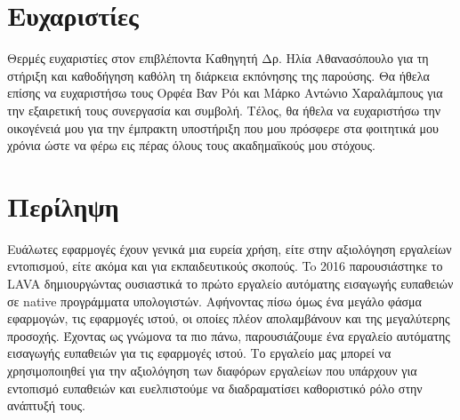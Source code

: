 \documentclass[12pt]{report}
\begin{document}
\newpage
{}
\setcounter{page}{1}

\section*{Ευχαριστίες}
Θερμές ευχαριστίες στον επιβλέποντα Καθηγητή Δρ. Hλία Αθανασόπουλο για τη στήριξη και καθοδήγηση καθόλη τη διάρκεια εκπόνησης της παρούσης.
Θα ήθελα επίσης να ευχαριστήσω τους Ορφέα Βαν Ρόι και Μάρκο Αντώνιο Χαραλάμπους για την εξαιρετική τους συνεργασία και συμβολή.
Τέλος, θα ήθελα να ευχαριστήσω την οικογένειά μου για την έμπρακτη υποστήριξη που μου
πρόσφερε στα φοιτητικά μου χρόνια ώστε να φέρω εις πέρας όλους τους ακαδημαϊκούς μου
στόχους.
\vspace*{2cm}

\newpage
\section*{Περίληψη}

Ευάλωτες εφαρμογές έχουν γενικά μια ευρεία χρήση, είτε στην αξιολόγηση εργαλείων εντοπισμού, είτε ακόμα και για εκπαιδευτικούς σκοπούς.
To 2016 παρουσιάστηκε το \textlatin{LAVA} δημιουργώντας ουσιαστικά το πρώτο εργαλείο 
αυτόματης εισαγωγής ευπαθειών σε \textlatin{native} προγράμματα υπολογιστών.
Αφήνοντας πίσω όμως ένα μεγάλο φάσμα εφαρμογών, τις εφαρμογές ιστού, οι οποίες πλέον απολαμβάνουν και της μεγαλύτερης προσοχής. Έχοντας ως γνώμονα 
τα πιο πάνω, παρουσιάζουμε ένα εργαλείο αυτόματης εισαγωγής ευπαθειών για τις εφαρμογές ιστού. Το εργαλείο μας μπορεί να χρησιμοποιηθεί για την
αξιολόγηση των διαφόρων εργαλείων που υπάρχουν για εντοπισμό ευπαθειών και ευελπιστούμε να διαδραματίσει καθοριστικό ρόλο στην ανάπτυξή τους.

\dominitoc
\tableofcontents

\setlength{\parindent}{0em}
\setlength{\parskip}{1.0em}

\clearpage 

\setcounter{page}{1}











\balance

\renewcommand{\bibname}{\textgreek{Βιβλιογραφία}}




\end{document}
